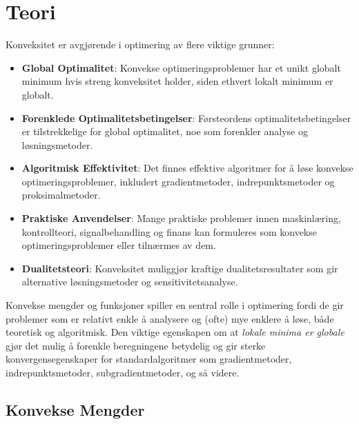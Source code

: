 \chapter{Teori}\label{chap:konveks_teori}

Konveksitet er avgjørende i optimering av flere viktige grunner:

\begin{itemize}
	\item \textbf{Global Optimalitet}: Konvekse optimeringsproblemer har et unikt globalt minimum hvis streng konveksitet holder, siden ethvert lokalt minimum er globalt.

	\item \textbf{Forenklede Optimalitetsbetingelser}: Førsteordens optimalitetsbetingelser er tilstrekkelige for global optimalitet, noe som forenkler analyse og løsningsmetoder.

	\item \textbf{Algoritmisk Effektivitet}: Det finnes effektive algoritmer for å løse konvekse optimeringsproblemer, inkludert gradientmetoder, indrepunktsmetoder og proksimalmetoder.

	\item \textbf{Praktiske Anvendelser}: Mange praktiske problemer innen maskinlæring, kontrollteori, signalbehandling og finans kan formuleres som konvekse optimeringsproblemer eller tilnærmes av dem.

	\item \textbf{Dualitetsteori}: Konveksitet muliggjør kraftige dualitetsresultater som gir alternative løsningsmetoder og sensitivitetsanalyse.
\end{itemize}

Konvekse mengder og funksjoner spiller en sentral rolle i optimering fordi de gir problemer som er relativt enkle å analysere og (ofte) mye enklere å løse, både teoretisk og algoritmisk.
Den viktige egenskapen om at \emph{lokale minima er globale} gjør det mulig å forenkle beregningene betydelig og gir sterke konvergensegenskaper for standardalgoritmer som gradientmetoder, indrepunktsmetoder, subgradientmetoder, og så videre.

\section{Konvekse Mengder}

